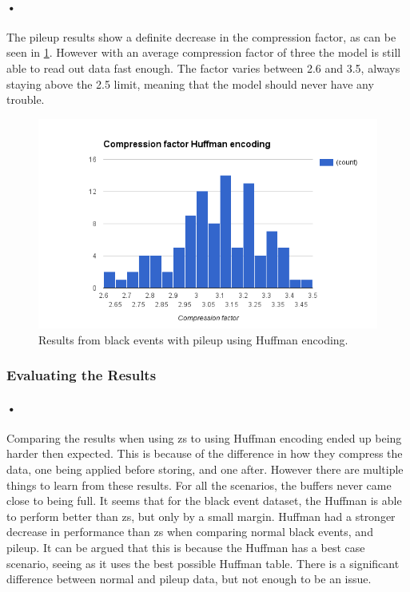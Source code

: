 \documentclass[a4paper, 12pt]{report}\dfrac{\right }{•}
\begin{document}
\paragraph{•}
The pileup results show a definite decrease in the compression factor, as can be seen in \ref{fig:comp-huffman-pileup}.
However with an average compression factor of three the model is still able to read out data fast enough.
The factor varies between 2.6 and 3.5, always staying above the 2.5 limit, meaning that the model should never have any trouble.

\begin{figure}[h!]
	\centering
		\includegraphics[width=1.0\textwidth]{images/compression-factor-pileup-huffman.png}
		\caption{Results from black events with pileup using Huffman encoding.}
		\label{fig:comp-huffman-pileup}
\end{figure}

\subsubsection{Evaluating the Results}

\paragraph{•}
Comparing the results when using \gls{zs} to using Huffman encoding ended up being harder then expected.
This is because of the difference in how they compress the data, one being applied before storing, and one after.
However there are multiple things to learn from these results.
For all the scenarios, the buffers never came close to being full.
It seems that for the black event dataset, the Huffman is able to perform better than \gls{zs}, but only by a small margin.
Huffman had a stronger decrease in performance than \gls{zs} when comparing normal black events, and pileup.
It can be argued that this is because the Huffman has a best case scenario, seeing as it uses the best possible Huffman table.
There is a significant difference between normal and pileup data, but not enough to be an issue.
\end{document}

